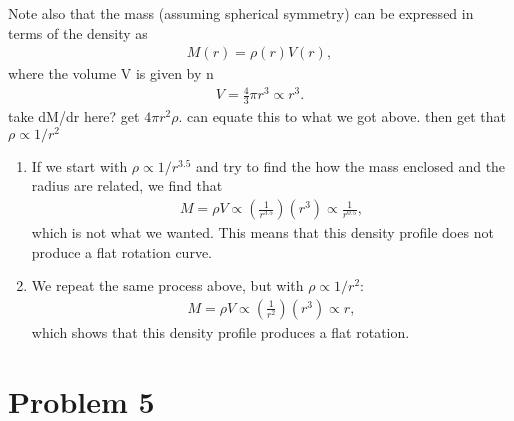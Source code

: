 \documentclass[11pt,letterpaper]{article}
\begin{document}
        Note also that the mass (assuming spherical symmetry) can be expressed in terms of the density as 
        \begin{align*}
            M(r) = \rho(r) V(r),
        \end{align*}
        where the volume V is given by n
        \begin{align*}
            V = \frac{4}{3}\pi r^3 \propto r^3.
        \end{align*}
        {\huge take dM/dr here? get $4\pi r^2 \rho$. can equate this to what we got above. then get that $\rho \propto 1/r^2$}

\begin{enumerate}[label=(\alph*)]
            \item If we start with $\rho \propto 1/r^{3.5}$ and try to find the how the mass enclosed and the radius are related, we find that 
        \begin{align*}
            M = \rho V \propto (\frac{1}{r^{3.5}}) (r^{3}) \propto \frac{1}{r^{0.5}},
        \end{align*}
        which is not what we wanted. This means that this density profile does not produce a flat rotation curve. 
    \item We repeat the same process above, but with $\rho \propto 1/r^{2}$:
        \begin{align*}
            M = \rho V \propto (\frac{1}{r^{2}}) (r^{3}) \propto r,
        \end{align*}
        which shows that this density profile produces a flat rotation.
\end{enumerate}

\section*{Problem 5} 
\end{document}
